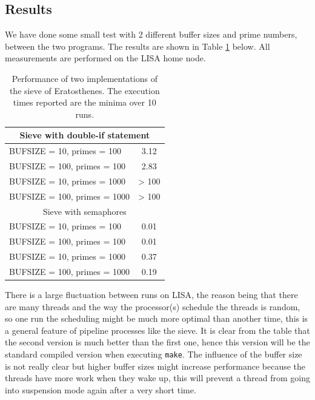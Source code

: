 \documentclass[11pt,a4paper,onecolumn]{article}
\begin{document}
\subsection{Results}
We have done some small test with 2 different buffer sizes and prime numbers, between the two programs. The results are shown in Table \ref{tab:sieve} below. All measurements are performed on the LISA home node.
\begin{table}[H]
  \centering
  \begin{tabular}{l | c}
    \hline
    \multicolumn{2}{c}{Sieve with double-if statement}\\
    \hline
    BUFSIZE = 10, primes = 100 & 3.12 \\
    BUFSIZE = 100, primes = 100 & 2.83 \\
    BUFSIZE = 10, primes = 1000 & > 100 \\
    BUFSIZE = 100, primes = 1000 & > 100 \\
    \hline
    \multicolumn{2}{c}{Sieve with semaphores}\\
    \hline
    BUFSIZE = 10, primes = 100 &  0.01 \\
    BUFSIZE = 100, primes = 100 & 0.01 \\
    BUFSIZE = 10, primes = 1000 & 0.37 \\
    BUFSIZE = 100, primes = 1000 & 0.19 \\
  \end{tabular}
  \caption{Performance of two implementations of the sieve of Eratosthenes. The execution times reported are the minima over 10 runs.}
  \label{tab:sieve}
\end{table}

There is a large fluctuation between runs on LISA, the reason being that there are many threads and the way the processor(s) schedule the threads is random, so one run the scheduling might be much more optimal than another time, this is a general feature of pipeline processes like the sieve. It is clear from the table that the second version is much better than the first one, hence this version will be the standard compiled version when executing \texttt{make}. The influence of the buffer size is not really clear but higher buffer sizes might increase performance because the threads have more work when they wake up, this will prevent a thread from going into suspension mode again after a very short time.
\end{document}
